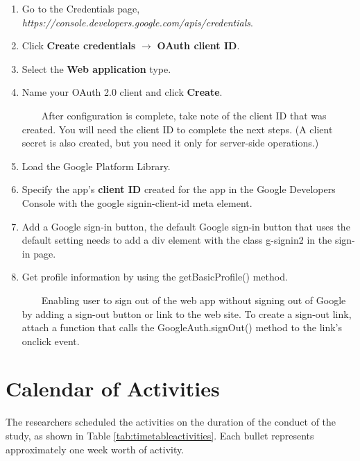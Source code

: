 \begin{enumerate}
	\item Go to the Credentials page, \emph{https://console.developers.google.com/apis/credentials}.
	\item Click \textbf{Create credentials} $\rightarrow$ \textbf{OAuth client ID}.
	\item Select the \textbf{Web application} type.
	\item Name your OAuth 2.0 client and click \textbf{Create}.
	
	~~~~After configuration is complete, take note of the client ID that was created. You will need the client ID to complete the next steps. (A client secret is also created, but you need it only for server-side operations.)
	\item Load the Google Platform Library.
	\item Specify the app’s \textbf{client ID} created for the app in the Google Developers Console with the google signin-client-id meta element.
	\item Add a Google sign-in button, the default Google sign-in button that uses the default setting needs to add a div element with the class g-signin2 in the sign-in page. 
	\item Get profile information by using the getBasicProfile() method.
	
	~~~~Enabling user to sign out of the web app without signing out of Google by adding a sign-out button or link to the web site. To create a sign-out link, attach a function that calls the GoogleAuth.signOut() method to the link’s onclick event. 
		
\end{enumerate}




\section{Calendar of Activities}

The researchers scheduled the activities on the duration of the conduct of the study, as shown in Table \ref{tab:timetableactivities}. Each bullet represents approximately one week worth of activity.

%
%
\newcommand{\weekone}{\textbullet}
\newcommand{\weektwo}{\textbullet \textbullet}
\newcommand{\weekthree}{\textbullet \textbullet \textbullet}
\newcommand{\weekfour}{\textbullet \textbullet \textbullet \textbullet}

